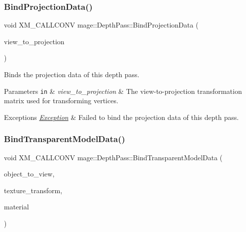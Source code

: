 \subsubsection{\texorpdfstring{Bind\+Projection\+Data()}{BindProjectionData()}}
{\footnotesize\ttfamily void X\+M\+\_\+\+C\+A\+L\+L\+C\+O\+NV mage\+::\+Depth\+Pass\+::\+Bind\+Projection\+Data (\begin{DoxyParamCaption}\item[{F\+X\+M\+M\+A\+T\+R\+IX}]{view\+\_\+to\+\_\+projection }\end{DoxyParamCaption})\hspace{0.3cm}{\ttfamily [private]}}

Binds the projection data of this depth pass.


\begin{DoxyParams}[1]{Parameters}
\mbox{\tt in}  & {\em view\+\_\+to\+\_\+projection} & The view-\/to-\/projection transformation matrix used for transforming vertices. \\
\hline
\end{DoxyParams}

\begin{DoxyExceptions}{Exceptions}
{\em \hyperlink{classmage_1_1_exception}{Exception}} & Failed to bind the projection data of this depth pass. \\
\hline
\end{DoxyExceptions}
\hypertarget{classmage_1_1_depth_pass_a3f7dae474252b416ab6ec42daf3ad9f5}{}\label{classmage_1_1_depth_pass_a3f7dae474252b416ab6ec42daf3ad9f5} 
\subsubsection{\texorpdfstring{Bind\+Transparent\+Model\+Data()}{BindTransparentModelData()}}
{\footnotesize\ttfamily void X\+M\+\_\+\+C\+A\+L\+L\+C\+O\+NV mage\+::\+Depth\+Pass\+::\+Bind\+Transparent\+Model\+Data (\begin{DoxyParamCaption}\item[{F\+X\+M\+M\+A\+T\+R\+IX}]{object\+\_\+to\+\_\+view,  }\item[{C\+X\+M\+M\+A\+T\+R\+IX}]{texture\+\_\+transform,  }\item[{const \hyperlink{classmage_1_1_material}{Material} \&}]{material }\end{DoxyParamCaption})\hspace{0.3cm}{\ttfamily [private]}}

